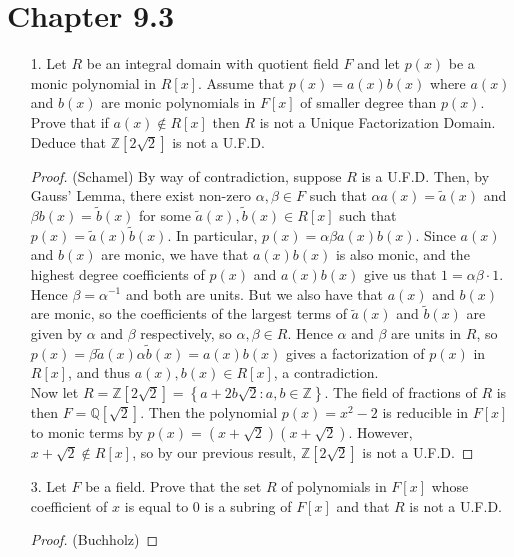 \documentclass[10pt]{article}
\newcommand{\Z}{\mathbb{Z}}
\newcommand{\Q}{\mathbb{Q}}
\newcommand{\set}[1]{\left\{ #1 \right\}}
\begin{document}
\section*{Chapter 9.3}
\begin{itemize}

\item[1.] Let $R$ be an integral domain with quotient field $F$ and let $p(x)$ be a monic polynomial in $R[x]$.  Assume that $p(x) = a(x)b(x)$ where $a(x)$ and $b(x)$ are monic polynomials in $F[x]$ of smaller degree than $p(x)$.  Prove that if $a(x) \notin R[x]$ then $R$ is not a Unique Factorization Domain.  Deduce that $\Z[2\sqrt{2}]$ is not a U.F.D.

\begin{proof}(Schamel)
By way of contradiction, suppose $R$ is a U.F.D.  Then, by Gauss' Lemma, there exist non-zero $\alpha,\beta \in F$ such that $\alpha a(x) = \tilde{a}(x)$ and $\beta b(x) = \tilde{b}(x)$ for some $\tilde{a}(x),\tilde{b}(x) \in R[x]$ such that $p(x) = \tilde{a}(x)\tilde{b}(x)$.  In particular, $p(x) = \alpha \beta a(x) b(x)$.  Since $a(x)$ and $b(x)$ are monic, we have that $a(x) b(x)$ is also monic, and the highest degree coefficients of $p(x)$ and $a(x) b(x)$ give us that $1 = \alpha \beta \cdot 1$.  Hence $\beta = \alpha^{-1}$ and both are units.  But we also have that $a(x)$ and $b(x)$ are monic, so the coefficients of the largest terms of $\tilde{a}(x)$ and $\tilde{b}(x)$ are given by $\alpha$ and $\beta$ respectively, so $\alpha,\beta \in R$.  Hence $\alpha$ and $\beta$ are units in $R$, so $p(x) = \beta \tilde{a}(x) \alpha \tilde{b}(x) = a(x)b(x)$ gives a factorization of $p(x)$ in $R[x]$, and thus $a(x), b(x) \in R[x]$, a contradiction. \\

Now let $R = \Z[2\sqrt{2}] = \set{a + 2b\sqrt{2}: a,b \in \Z}$.  The
field of fractions of $R$ is then $F = \Q[\sqrt{2}]$.  Then the
polynomial $p(x) = x^2 - 2$ is reducible in $F[x]$ to monic terms by
$p(x) = (x+\sqrt{2})(x+\sqrt{2})$.  However, $x+\sqrt{2} \notin
R[x]$, so by our previous result, $\Z[2\sqrt{2}]$ is not a U.F.D.
\end{proof}


\item[3.]  Let $F$ be a field.  Prove that the set $R$ of polynomials in $F[x]$ whose coefficient of $x$ is equal to 0 is a subring of $F[x]$ and that $R$ is not a U.F.D.

\begin{proof}(Buchholz)


\end{proof}
\end{itemize}
\end{document}

